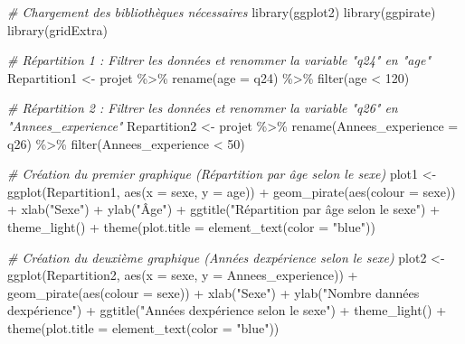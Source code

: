 \documentclass[
  14pt,
]{article}
\newenvironment{Shaded}{\begin{snugshade}}{\end{snugshade}}
\newcommand{\AttributeTok}[1]{\textcolor[rgb]{0.77,0.63,0.00}{#1}}
\newcommand{\CommentTok}[1]{\textcolor[rgb]{0.56,0.35,0.01}{\textit{#1}}}
\newcommand{\DecValTok}[1]{\textcolor[rgb]{0.00,0.00,0.81}{#1}}
\newcommand{\FunctionTok}[1]{\textcolor[rgb]{0.00,0.00,0.00}{#1}}
\newcommand{\NormalTok}[1]{#1}
\newcommand{\OtherTok}[1]{\textcolor[rgb]{0.56,0.35,0.01}{#1}}
\newcommand{\SpecialCharTok}[1]{\textcolor[rgb]{0.00,0.00,0.00}{#1}}
\newcommand{\StringTok}[1]{\textcolor[rgb]{0.31,0.60,0.02}{#1}}
\begin{document}
\begin{Shaded}
\begin{Highlighting}[]
\CommentTok{\# Chargement des bibliothèques nécessaires}
\FunctionTok{library}\NormalTok{(ggplot2)}
\FunctionTok{library}\NormalTok{(ggpirate)}
\FunctionTok{library}\NormalTok{(gridExtra)}

\CommentTok{\# Répartition 1 : Filtrer les données et renommer la variable "q24" en "age"}
\NormalTok{Repartition1 }\OtherTok{\textless{}{-}}\NormalTok{ projet }\SpecialCharTok{\%\textgreater{}\%}
  \FunctionTok{rename}\NormalTok{(}\AttributeTok{age =}\NormalTok{ q24) }\SpecialCharTok{\%\textgreater{}\%}
  \FunctionTok{filter}\NormalTok{(age }\SpecialCharTok{\textless{}} \DecValTok{120}\NormalTok{)}

\CommentTok{\# Répartition 2 : Filtrer les données et renommer la variable "q26" en "Annees\_experience"}
\NormalTok{Repartition2 }\OtherTok{\textless{}{-}}\NormalTok{ projet }\SpecialCharTok{\%\textgreater{}\%}
  \FunctionTok{rename}\NormalTok{(}\AttributeTok{Annees\_experience =}\NormalTok{ q26) }\SpecialCharTok{\%\textgreater{}\%}
  \FunctionTok{filter}\NormalTok{(Annees\_experience }\SpecialCharTok{\textless{}} \DecValTok{50}\NormalTok{)}

\CommentTok{\# Création du premier graphique (Répartition par âge selon le sexe)}
\NormalTok{plot1 }\OtherTok{\textless{}{-}} \FunctionTok{ggplot}\NormalTok{(Repartition1, }\FunctionTok{aes}\NormalTok{(}\AttributeTok{x =}\NormalTok{ sexe, }\AttributeTok{y =}\NormalTok{ age)) }\SpecialCharTok{+}
  \FunctionTok{geom\_pirate}\NormalTok{(}\FunctionTok{aes}\NormalTok{(}\AttributeTok{colour =}\NormalTok{ sexe)) }\SpecialCharTok{+}
  \FunctionTok{xlab}\NormalTok{(}\StringTok{"Sexe"}\NormalTok{) }\SpecialCharTok{+}
  \FunctionTok{ylab}\NormalTok{(}\StringTok{"Âge"}\NormalTok{) }\SpecialCharTok{+}
  \FunctionTok{ggtitle}\NormalTok{(}\StringTok{"Répartition par âge selon le sexe"}\NormalTok{) }\SpecialCharTok{+}
  \FunctionTok{theme\_light}\NormalTok{() }\SpecialCharTok{+}
  \FunctionTok{theme}\NormalTok{(}\AttributeTok{plot.title =} \FunctionTok{element\_text}\NormalTok{(}\AttributeTok{color =} \StringTok{"blue"}\NormalTok{))}

\CommentTok{\# Création du deuxième graphique (Années d\textquotesingle{}expérience selon le sexe)}
\NormalTok{plot2 }\OtherTok{\textless{}{-}} \FunctionTok{ggplot}\NormalTok{(Repartition2, }\FunctionTok{aes}\NormalTok{(}\AttributeTok{x =}\NormalTok{ sexe, }\AttributeTok{y =}\NormalTok{ Annees\_experience)) }\SpecialCharTok{+}
  \FunctionTok{geom\_pirate}\NormalTok{(}\FunctionTok{aes}\NormalTok{(}\AttributeTok{colour =}\NormalTok{ sexe)) }\SpecialCharTok{+}
  \FunctionTok{xlab}\NormalTok{(}\StringTok{"Sexe"}\NormalTok{) }\SpecialCharTok{+}
  \FunctionTok{ylab}\NormalTok{(}\StringTok{"Nombre d\textquotesingle{}années d\textquotesingle{}expérience"}\NormalTok{) }\SpecialCharTok{+}
  \FunctionTok{ggtitle}\NormalTok{(}\StringTok{"Années d\textquotesingle{}expérience selon le sexe"}\NormalTok{) }\SpecialCharTok{+}
  \FunctionTok{theme\_light}\NormalTok{() }\SpecialCharTok{+}
  \FunctionTok{theme}\NormalTok{(}\AttributeTok{plot.title =} \FunctionTok{element\_text}\NormalTok{(}\AttributeTok{color =} \StringTok{"blue"}\NormalTok{))}


\end{Highlighting}
\end{Shaded}
\end{document}
